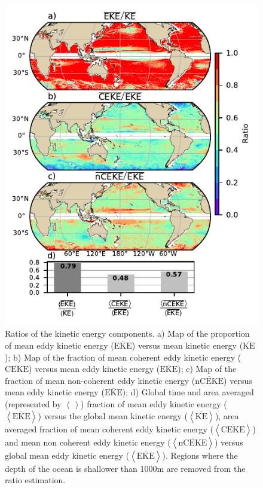 \documentclass[draft,linenumbers]{agujournal2019}
\newcommand{\MKE}{\overline{\textrm{KE}}}
\newcommand{\MEKE}{\overline{\textrm{EKE}}}
\newcommand{\MCEKE}{\overline{\textrm{CEKE}}}
\newcommand{\MnCEKE}{\overline{\textrm{nCEKE}}}
\begin{document}
	\begin{figure}
	    \centering
	    \includegraphics[width=1\textwidth]{figures/eke_ratio_map_easy.pdf}
	    \caption{Ratios of the kinetic energy components. a) Map of the proportion of mean eddy kinetic energy ($\MEKE$) versus mean kinetic energy ($\MKE$);
		b) Map of the fraction of mean coherent eddy kinetic energy ($\MCEKE$) versus mean eddy kinetic energy ($\MEKE$);
		c) Map of the fraction of mean non-coherent eddy kinetic energy ($\MnCEKE$) versus mean eddy kinetic energy ($\MEKE$);
		d) Global time and area averaged (represented by $\left<\,\right>$) fraction of mean eddy kinetic energy ($\left<\MEKE\right>$) versus the global mean kinetic energy ($\left<\MKE\right>$), area averaged fraction of mean coherent eddy kinetic energy ($\left<\MCEKE\right>$) and mean non coherent eddy kinetic energy ($\left<\MnCEKE\right>$) versus global mean eddy kinetic energy ($\left<\MEKE\right>$). Regions where the depth of the ocean is shallower than 1000m are removed from the ratio estimation.
		}
	    \label{fig:eddy_ratio}
	\end{figure}
\end{document}
